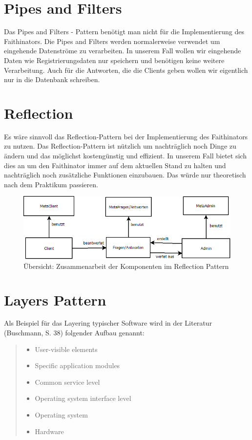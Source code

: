 \documentclass{scrreprt}
\begin{document}
\section{Pipes and Filters}
Das Pipes and Filters - Pattern benötigt man nicht für die Implementierung des Faithinators. Die Pipes and Filters werden normalerweise verwendet um eingehende Datenströme zu verarbeiten. In unserem Fall wollen wir eingehende Daten wie Registrierungsdaten nur speichern und benötigen keine weitere Verarbeitung. Auch für die Antworten, die die Clients geben wollen wir eigentlich nur in die Datenbank schreiben.

\section{Reflection}
Es wäre sinnvoll das Reflection-Pattern bei der Implementierung des Faithinators zu nutzen. Das Reflection-Pattern ist nützlich um nachträglich noch Dinge zu ändern und das möglichst kostengünstig und effizient. In unserem Fall bietet sich dies an um den Faithinator immer auf dem aktuellen Stand zu halten und nachträglich noch zusätzliche Funktionen einzubauen. Das würde nur theoretisch nach dem  Praktikum passieren.
\begin{figure}[ht]
 \includegraphics[width=\textwidth]{./pics/Reflect.png}
 \caption{Übersicht: Zusammenarbeit der Komponenten im Reflection Pattern}
 \label{abb:3}
\end{figure}

\section{Layers Pattern}
Als Beispiel für das Layering typischer Software wird in der Literatur (Buschmann, S. 38) folgender Aufbau genannt:

\begin{quote}
\begin{itemize}
 \item User-visible elements
 \item Specific application modules
 \item Common service level
 \item Operating system interface level
 \item Operating system
 \item Hardware
\end{itemize}
\end{quote}
\end{document}
